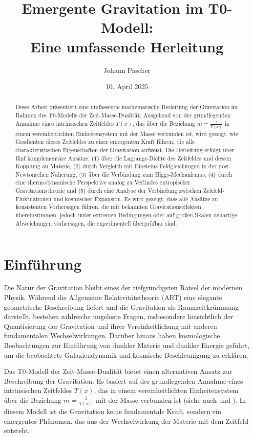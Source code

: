 \documentclass[12pt,a4paper]{article}
\title{Emergente Gravitation im T0-Modell: \\Eine umfassende Herleitung}
\author{Johann Pascher}
\date{10. April 2025}
\newcommand{\Tfield}{T(x)}
\begin{document}
	
	\maketitle
	
	\begin{abstract}
		Diese Arbeit präsentiert eine umfassende mathematische Herleitung der Gravitation im Rahmen des T0-Modells der Zeit-Masse-Dualität. Ausgehend von der grundlegenden Annahme eines intrinsischen Zeitfeldes \(\Tfield\), das über die Beziehung \(m = \frac{1}{\Tfield}\) in einem vereinheitlichten Einheitensystem mit der Masse verbunden ist, wird gezeigt, wie Gradienten dieses Zeitfeldes zu einer emergenten Kraft führen, die alle charakteristischen Eigenschaften der Gravitation aufweist. Die Herleitung erfolgt über fünf komplementäre Ansätze: (1) über die Lagrange-Dichte des Zeitfeldes und dessen Kopplung an Materie, (2) durch Vergleich mit Einsteins Feldgleichungen in der post-Newtonschen Näherung, (3) über die Verbindung zum Higgs-Mechanismus, (4) durch eine thermodynamische Perspektive analog zu Verlindes entropischer Gravitationstheorie und (5) durch eine Analyse der Verbindung zwischen Zeitfeld-Fluktuationen und kosmischer Expansion. Es wird gezeigt, dass alle Ansätze zu konsistenten Vorhersagen führen, die mit bekannten Gravitationseffekten übereinstimmen, jedoch unter extremen Bedingungen oder auf großen Skalen neuartige Abweichungen vorhersagen, die experimentell überprüfbar sind.
	\end{abstract}
	
	\tableofcontents
	\newpage
	
	\section{Einführung}
	\label{sec:introduction}
	Die Natur der Gravitation bleibt eines der tiefgründigsten Rätsel der modernen Physik. Während die Allgemeine Relativitätstheorie (ART) eine elegante geometrische Beschreibung liefert und die Gravitation als Raumzeitkrümmung darstellt, bestehen zahlreiche ungelöste Fragen, insbesondere hinsichtlich der Quantisierung der Gravitation und ihrer Vereinheitlichung mit anderen fundamentalen Wechselwirkungen. Darüber hinaus haben kosmologische Beobachtungen zur Einführung von dunkler Materie und dunkler Energie geführt, um die beobachtete Galaxiendynamik und kosmische Beschleunigung zu erklären.
	
	Das T0-Modell der Zeit-Masse-Dualität \cite{pascher_galaxies_2025} bietet einen alternativen Ansatz zur Beschreibung der Gravitation. Es basiert auf der grundlegenden Annahme eines intrinsischen Zeitfeldes \(\Tfield\), das in einem vereinheitlichten Einheitensystem über die Beziehung \(m = \frac{1}{\Tfield}\) mit der Masse verbunden ist (siehe auch \cite{pascher_zeit_2025} und \cite{pascher_higgs_2025}). In diesem Modell ist die Gravitation keine fundamentale Kraft, sondern ein emergentes Phänomen, das aus der Wechselwirkung der Materie mit dem Zeitfeld entsteht.
	
\end{document}
